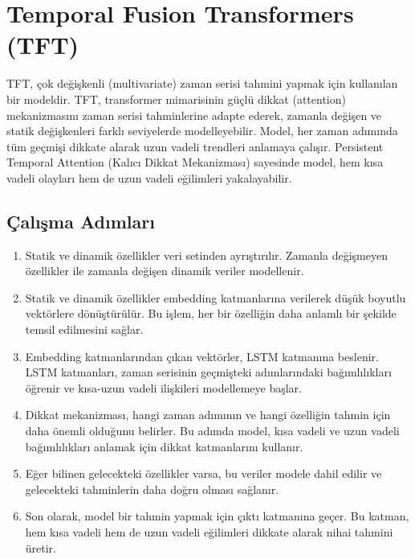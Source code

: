 \section{Temporal Fusion Transformers (TFT)}

TFT, çok değişkenli (multivariate) zaman serisi tahmini yapmak için kullanılan bir modeldir. TFT, transformer mimarisinin güçlü dikkat (attention) mekanizmasını zaman serisi tahminlerine adapte ederek, zamanla değişen ve statik değişkenleri farklı seviyelerde modelleyebilir. Model, her zaman adımında tüm geçmişi dikkate alarak uzun vadeli trendleri anlamaya çalışır. Persistent Temporal Attention (Kalıcı Dikkat Mekanizması) sayesinde model, hem kısa vadeli olayları hem de uzun vadeli eğilimleri yakalayabilir.

\subsection{Çalışma Adımları}

\begin{enumerate}
    \item Statik ve dinamik özellikler veri setinden ayrıştırılır. Zamanla değişmeyen özellikler ile zamanla değişen dinamik veriler modellenir.
    \item Statik ve dinamik özellikler embedding katmanlarına verilerek düşük boyutlu vektörlere dönüştürülür. Bu işlem, her bir özelliğin daha anlamlı bir şekilde temsil edilmesini sağlar.
    \item Embedding katmanlarından çıkan vektörler, LSTM katmanına beslenir. LSTM katmanları, zaman serisinin geçmişteki adımlarındaki bağımlılıkları öğrenir ve kısa-uzun vadeli ilişkileri modellemeye başlar.
    \item Dikkat mekanizması, hangi zaman adımının ve hangi özelliğin tahmin için daha önemli olduğunu belirler. Bu adımda model, kısa vadeli ve uzun vadeli bağımlılıkları anlamak için dikkat katmanlarını kullanır.
    \item Eğer bilinen gelecekteki özellikler varsa, bu veriler modele dahil edilir ve gelecekteki tahminlerin daha doğru olması sağlanır.
    \item Son olarak, model bir tahmin yapmak için çıktı katmanına geçer. Bu katman, hem kısa vadeli hem de uzun vadeli eğilimleri dikkate alarak nihai tahmini üretir.
\end{enumerate}

\newpage